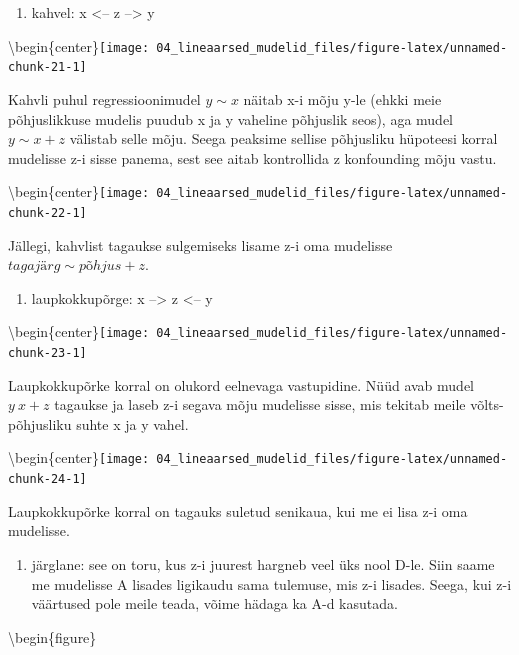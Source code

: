 \documentclass[]{book}
\providecommand{\tightlist}{%
  \setlength{\itemsep}{0pt}\setlength{\parskip}{0pt}}
\begin{document}
\begin{enumerate}
\def\labelenumi{\arabic{enumi}.}
\setcounter{enumi}{1}
\tightlist
\item
  kahvel: x \textless{}-- z --\textgreater{} y
\end{enumerate}

\textbackslash{}begin\{center\}\texttt{[image: 04\_lineaarsed\_mudelid\_files/figure-latex/unnamed-chunk-21-1]}

Kahvli puhul regressioonimudel \(y \sim x\) näitab x-i mõju y-le (ehkki meie põhjuslikkuse mudelis puudub x ja y vaheline põhjuslik seos), aga mudel \(y \sim x + z\) välistab selle mõju. Seega peaksime sellise põhjusliku hüpoteesi korral mudelisse z-i sisse panema, sest see aitab kontrollida z konfounding mõju vastu.

\textbackslash{}begin\{center\}\texttt{[image: 04\_lineaarsed\_mudelid\_files/figure-latex/unnamed-chunk-22-1]}

Jällegi, kahvlist tagaukse sulgemiseks lisame z-i oma mudelisse \(tagajärg \sim põhjus + z\).

\begin{enumerate}
\def\labelenumi{\arabic{enumi}.}
\setcounter{enumi}{2}
\tightlist
\item
  laupkokkupõrge: x --\textgreater{} z \textless{}-- y
\end{enumerate}

\textbackslash{}begin\{center\}\texttt{[image: 04\_lineaarsed\_mudelid\_files/figure-latex/unnamed-chunk-23-1]}

Laupkokkupõrke korral on olukord eelnevaga vastupidine. Nüüd avab mudel \(y ~ x + z\) tagaukse ja laseb z-i segava mõju mudelisse sisse, mis tekitab meile võlts-põhjusliku suhte x ja y vahel.

\textbackslash{}begin\{center\}\texttt{[image: 04\_lineaarsed\_mudelid\_files/figure-latex/unnamed-chunk-24-1]}

Laupkokkupõrke korral on tagauks suletud senikaua, kui me ei lisa z-i oma mudelisse.

\begin{enumerate}
\def\labelenumi{\arabic{enumi}.}
\setcounter{enumi}{3}
\tightlist
\item
  järglane: see on toru, kus z-i juurest hargneb veel üks nool D-le. Siin saame me mudelisse A lisades ligikaudu sama tulemuse, mis z-i lisades. Seega, kui z-i väärtused pole meile teada, võime hädaga ka A-d kasutada.
\end{enumerate}

\textbackslash{}begin\{figure\}
\end{document}
